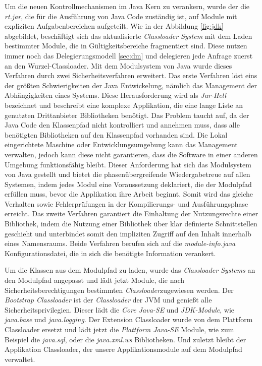     Um die neuen Kontrollmechanismen im Java Kern zu verankern, wurde der die \textit{rt.jar}, die für die Ausführung von Java Code zuständig ist, auf Module mit expliziten Aufgabenbereichen aufgeteilt. Wie in der Abbildung \ref{fig:jdk} abgebildet, beschäftigt sich das aktualisierte \textit{Classloader System} mit dem Laden bestimmter Module, die in Gültigkeitsbereiche fragmentiert sind. Diese nutzen immer noch das Delegierungsmodell \ref{sec:dm} und delegieren jede Anfrage zuerst an den Wurzel-Classloader. Mit dem Modulsystem von Java wurde dieses Verfahren durch zwei Sicherheitsverfahren erweitert. Das erste Verfahren löst eins der größten Schwierigkeiten der Java Entwickelung, nämlich das Management der Abhängigkeiten eines Systems. Diese Herausforderung wird als \textit{Jar-Hell} bezeichnet und beschreibt eine komplexe Applikation, die eine lange Liste an genutzten Drittanbieter Bibliotheken benötigt. Das Problem taucht auf, da der Java Code den Klassenpfad nicht kontrolliert und annehmen muss, dass alle benötigten Bibliotheken auf den Klassenpfad vorhanden sind. Die Lokal eingerichtete Maschine oder Entwicklungsumgebung kann das Management verwalten, jedoch kann diese nicht garantieren, dass die Software in einer anderen Umgebung funktionsfähig bleibt.\newline
    Dieser Anforderung hat sich das Modulsystem von Java gestellt und bietet die phasenübergreifende Wiedergabetreue auf allen Systemen, indem jedes Modul eine Voraussetzung deklariert, die der Modulpfad erfüllen muss, bevor die Applikation ihre Arbeit beginnt. Somit wird das gleiche Verhalten sowie Fehlerprüfungen in der Kompilierungs- und Ausführungsphase erreicht.\newline
    Das zweite Verfahren garantiert die Einhaltung der Nutzungsrechte einer Bibliothek, indem die Nutzung einer Bibliothek über klar definierte Schnittstellen geschieht und unterbindet somit den impliziten Zugriff auf den Inhalt innerhalb eines Namensraums. Beide Verfahren berufen sich auf die \textit{module-info.java} Konfigurationsdatei, die in sich die benötigte Information verankert. \bigbreak

    Um die Klassen aus dem Modulpfad zu laden, wurde das \textit{Classloader Systems} an den Modulpfad angepasst und lädt jetzt Module, die nach Sicherheitsberechtigungen bestimmten \textit{Classloader}zugewiesen werden. Der \textit{Bootstrap Classloader} ist der \textit{Classloader} der JVM und genießt alle Sicherheitsprivilegien. Dieser lädt die \textit{Core Java-SE} und \textit{JDK-Module}, wie \textit{java.base} und \textit{java.logging}. Der Extension Classloader wurde von dem Plattform Classloader ersetzt und lädt jetzt die \textit{Plattform Java-SE} Module, wie zum Beispiel die \textit{java.sql}, oder die \textit{java.xml.ws} Bibliotheken. Und zuletzt bleibt der Applikation Classloader, der unsere Applikationsmodule auf dem Modulpfad verwaltet. \cite{classLoadingOracle,modulMitJava9,java9modRevealed}

